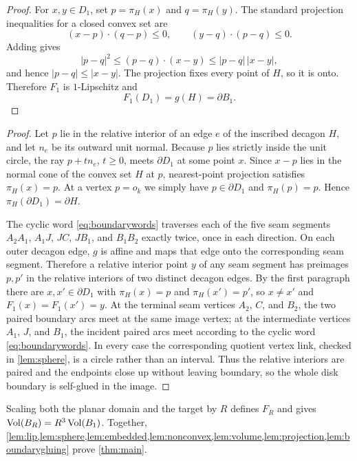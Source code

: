 \begin{proof}
For $x,y\in D_1$, set $p=\pi_H(x)$ and $q=\pi_H(y)$.  The standard projection inequalities for a closed convex set are
\[
(x-p)\cdot(q-p)\le0,
\qquad
(y-q)\cdot(p-q)\le0.
\]
Adding gives
\[
|p-q|^2\le(p-q)\cdot(x-y)\le |p-q|\,|x-y|,
\]
and hence $|p-q|\le|x-y|$.  The projection fixes every point of $H$, so it is onto.  Therefore $F_1$ is $1$-Lipschitz and
\[
F_1(D_1)=g(H)=\partial B_1.
\]
\end{proof}


\begin{proof}
Let $p$ lie in the relative interior of an edge $e$ of the inscribed decagon $H$, and let $n_e$ be its outward unit normal.  Because $p$ lies strictly inside the unit circle, the ray $p+t n_e$, $t\ge0$, meets $\partial D_1$ at some point $x$.  Since $x-p$ lies in the normal cone of the convex set $H$ at $p$, nearest-point projection satisfies $\pi_H(x)=p$.  At a vertex $p=o_k$ we simply have $p\in\partial D_1$ and $\pi_H(p)=p$.  Hence $\pi_H(\partial D_1)=\partial H$.

The cyclic word \eqref{eq:boundarywords} traverses each of the five seam segments $A_2A_1$, $A_1J$, $JC$, $JB_1$, and $B_1B_2$ exactly twice, once in each direction.  On each outer decagon edge, $g$ is affine and maps that edge onto the corresponding seam segment.  Therefore a relative interior point $y$ of any seam segment has preimages $p,p'$ in the relative interiors of two distinct decagon edges.  By the first paragraph there are $x,x'\in\partial D_1$ with $\pi_H(x)=p$ and $\pi_H(x')=p'$, so $x\ne x'$ and $F_1(x)=F_1(x')=y$.  At the terminal seam vertices $A_2$, $C$, and $B_2$, the two paired boundary arcs meet at the same image vertex; at the intermediate vertices $A_1$, $J$, and $B_1$, the incident paired arcs meet according to the cyclic word \eqref{eq:boundarywords}.  In every case the corresponding quotient vertex link, checked in \cref{lem:sphere}, is a circle rather than an interval.  Thus the relative interiors are paired and the endpoints close up without leaving boundary, so the whole disk boundary is self-glued in the image.
\end{proof}

Scaling both the planar domain and the target by $R$ defines $F_R$ and gives $\operatorname{Vol}(B_R)=R^3\operatorname{Vol}(B_1)$.  Together, \cref{lem:lip,lem:sphere,lem:embedded,lem:nonconvex,lem:volume,lem:projection,lem:boundarygluing} prove \cref{thm:main}.

